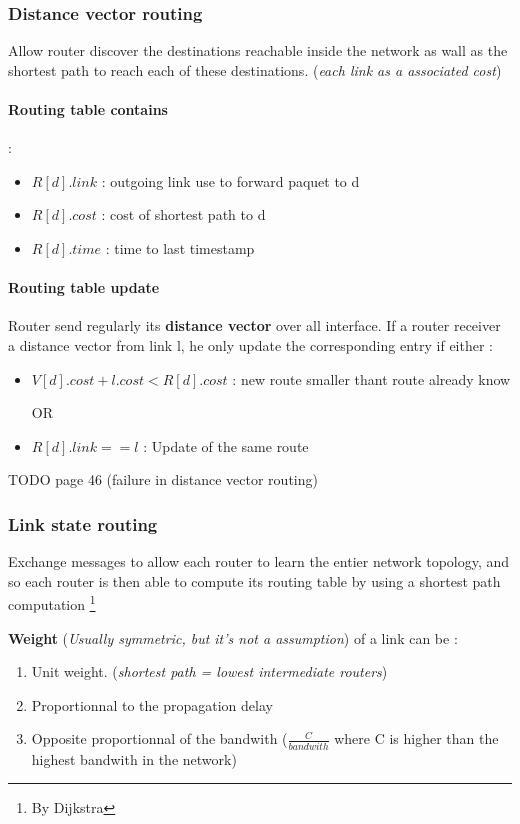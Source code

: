\subsubsection{Distance vector routing}
Allow router discover the destinations reachable inside the network as wall as
the shortest path to reach each of these destinations.
(\textit{each link as a associated cost})


\paragraph{Routing table contains} :
\begin{itemize}
    \item $R[d].link$ : outgoing link use to forward paquet to d
    \item $R[d].cost$ : cost of shortest path to d
    \item $R[d].time$ : time to last timestamp
\end{itemize}

\paragraph{Routing table update}
Router send regularly its \textbf{distance vector} over all interface.
If a router receiver a distance vector from link l, he only update
the corresponding entry  if either :
\begin{itemize}
    \item $V[d].cost+l.cost < R[d].cost$ : new route smaller thant route already know
    \item[OR]
    \item $R[d].link == l$ : Update of the same route
\end{itemize}

TODO page 46 (failure in distance vector routing)

\subsubsection{Link state routing}
Exchange messages to allow each router to learn the entier network topology, and so
each router is then able to compute its routing table by using a shortest path computation
\footnote{By Dijkstra}

\textbf{Weight} (\textit{Usually symmetric, but it's not a assumption}) of a link can be :
\begin{enumerate}
    \item Unit weight. (\textit{shortest path = lowest intermediate routers})
    \item Proportionnal to the propagation delay
    \item Opposite proportionnal of the bandwith ($\frac{C}{bandwith}$ where C is
    higher than the highest bandwith in the network)
\end{enumerate}

